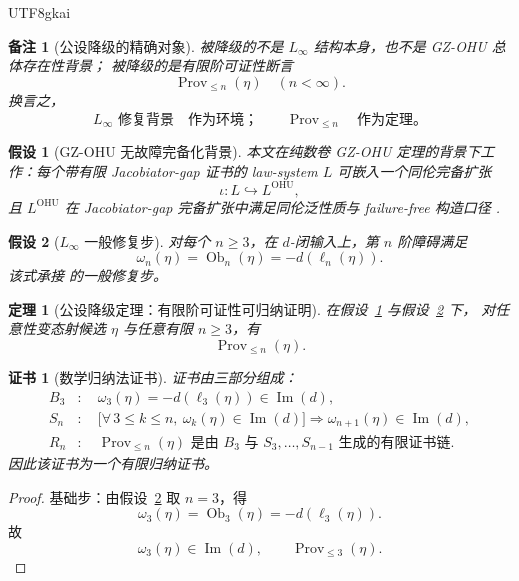 \documentclass[12pt]{article}
\newtheorem{assumption}{假设}[section]
\newtheorem{theorem}{定理}[section]
\newtheorem{remark}{备注}[section]
\newtheorem{Certificate}{证书}[section]
\newcommand{\Linfty}{\ensuremath{L_\infty}}
\newcommand{\Layer}{\ell}
\newcommand{\Ob}{\operatorname{Ob}}
\newcommand{\Imop}{\operatorname{Im}}
\newcommand{\Prov}{\operatorname{Prov}}
\begin{document}
\begin{CJK*}{UTF8}{gkai}
\begin{remark}[公设降级的精确对象]
被降级的不是 \Linfty{} 结构本身，也不是 GZ-OHU 总体存在性背景；
被降级的是有限阶可证性断言
\[
  \Prov_{\le n}(\eta)
  \quad(n<\infty).
\]
换言之，
\[
  \Linfty\text{ 修复背景}
  \quad\text{作为环境；}\qquad
  \Prov_{\le n}
  \quad\text{作为定理。}
\]
\end{remark}

\begin{assumption}[GZ-OHU 无故障完备化背景]
\label{ass:tex50-gz-ohu}
本文在纯数卷 GZ-OHU 定理的背景下工作：每个带有限 Jacobiator-gap 证书的 law-system $L$ 可嵌入一个同伦完备扩张
\[
  \iota:L\hookrightarrow L^{\mathrm{OHU}},
\]
且 $L^{\mathrm{OHU}}$ 在 Jacobiator-gap 完备扩张中满足同伦泛性质与 failure-free 构造口径
\cite{GaoZhengPureMath}.
\end{assumption}

\begin{assumption}[\texorpdfstring{$L_\infty$}{L-infinity} 一般修复步]
\label{ass:tex50-linfty-step}
对每个 $n\ge 3$，在 $d$-闭输入上，第 $n$ 阶障碍满足
\[
  \omega_n(\eta)=\Ob_n(\eta)=-d(\Layer_n(\eta)).
\]
该式承接 \cite{RepoTex12LinftyRepair} 的一般修复步。
\end{assumption}

\begin{theorem}[公设降级定理：有限阶可证性可归纳证明]
\label{thm:tex50-prov-induction}
在假设~\ref{ass:tex50-gz-ohu} 与假设~\ref{ass:tex50-linfty-step} 下，
对任意性变态射候选 $\eta$ 与任意有限 $n\ge 3$，有
\[
  \Prov_{\le n}(\eta).
\]
\end{theorem}

\begin{Certificate}[数学归纳法证书]
\label{cert:tex50-prov-induction}
证书由三部分组成：
\[
\begin{aligned}
  B_3&:\quad \omega_3(\eta)=-d(\Layer_3(\eta))\in\Imop(d),\\
  S_n&:\quad
  \bigl[\forall\,3\le k\le n,\ \omega_k(\eta)\in\Imop(d)\bigr]
  \Rightarrow
  \omega_{n+1}(\eta)\in\Imop(d),\\
  R_n&:\quad
  \Prov_{\le n}(\eta)
  \text{ 是由 }B_3\text{ 与 }S_3,\dots,S_{n-1}\text{ 生成的有限证书链}.
\end{aligned}
\]
因此该证书为一个有限归纳证书。
\end{Certificate}

\begin{proof}
基础步：由假设~\ref{ass:tex50-linfty-step} 取 $n=3$，得
\[
  \omega_3(\eta)=\Ob_3(\eta)=-d(\Layer_3(\eta)).
\]
故
\[
  \omega_3(\eta)\in\Imop(d),
  \qquad
  \Prov_{\le 3}(\eta).
\]


\end{proof}
\end{CJK*}
\end{document}
